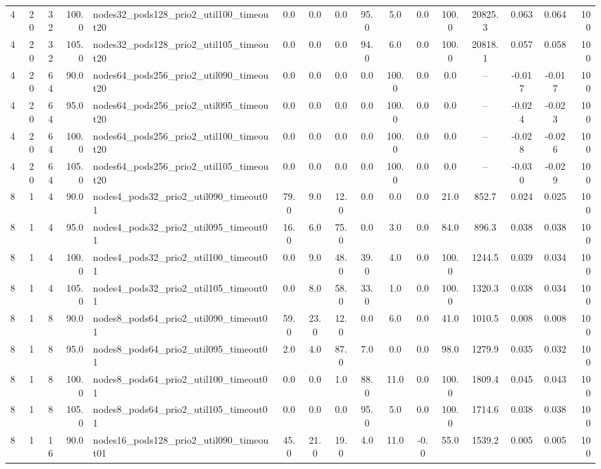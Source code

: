\begin{tabular}{r r r r l c c c c c c c c c c r}
4 & 20 & 32 & 100.0 & nodes32\_pods128\_prio2\_util100\_timeout20 & 0.0 & 0.0 & 0.0 & 95.0 & 5.0 & 0.0 & 100.0 & 20825.3 & 0.063 & 0.064 & 100 \\
4 & 20 & 32 & 105.0 & nodes32\_pods128\_prio2\_util105\_timeout20 & 0.0 & 0.0 & 0.0 & 94.0 & 6.0 & 0.0 & 100.0 & 20818.1 & 0.057 & 0.058 & 100 \\
4 & 20 & 64 & 90.0 & nodes64\_pods256\_prio2\_util090\_timeout20 & 0.0 & 0.0 & 0.0 & 0.0 & 100.0 & 0.0 & 0.0 & -- & -0.017 & -0.017 & 100 \\
4 & 20 & 64 & 95.0 & nodes64\_pods256\_prio2\_util095\_timeout20 & 0.0 & 0.0 & 0.0 & 0.0 & 100.0 & 0.0 & 0.0 & -- & -0.024 & -0.023 & 100 \\
4 & 20 & 64 & 100.0 & nodes64\_pods256\_prio2\_util100\_timeout20 & 0.0 & 0.0 & 0.0 & 0.0 & 100.0 & 0.0 & 0.0 & -- & -0.028 & -0.026 & 100 \\
4 & 20 & 64 & 105.0 & nodes64\_pods256\_prio2\_util105\_timeout20 & 0.0 & 0.0 & 0.0 & 0.0 & 100.0 & 0.0 & 0.0 & -- & -0.030 & -0.029 & 100 \\
8 & 1 & 4 & 90.0 & nodes4\_pods32\_prio2\_util090\_timeout01 & 79.0 & 9.0 & 12.0 & 0.0 & 0.0 & 0.0 & 21.0 & 852.7 & 0.024 & 0.025 & 100 \\
8 & 1 & 4 & 95.0 & nodes4\_pods32\_prio2\_util095\_timeout01 & 16.0 & 6.0 & 75.0 & 0.0 & 3.0 & 0.0 & 84.0 & 896.3 & 0.038 & 0.038 & 100 \\
8 & 1 & 4 & 100.0 & nodes4\_pods32\_prio2\_util100\_timeout01 & 0.0 & 9.0 & 48.0 & 39.0 & 4.0 & 0.0 & 100.0 & 1244.5 & 0.039 & 0.034 & 100 \\
8 & 1 & 4 & 105.0 & nodes4\_pods32\_prio2\_util105\_timeout01 & 0.0 & 8.0 & 58.0 & 33.0 & 1.0 & 0.0 & 100.0 & 1320.3 & 0.038 & 0.034 & 100 \\
8 & 1 & 8 & 90.0 & nodes8\_pods64\_prio2\_util090\_timeout01 & 59.0 & 23.0 & 12.0 & 0.0 & 6.0 & 0.0 & 41.0 & 1010.5 & 0.008 & 0.008 & 100 \\
8 & 1 & 8 & 95.0 & nodes8\_pods64\_prio2\_util095\_timeout01 & 2.0 & 4.0 & 87.0 & 7.0 & 0.0 & 0.0 & 98.0 & 1279.9 & 0.035 & 0.032 & 100 \\
8 & 1 & 8 & 100.0 & nodes8\_pods64\_prio2\_util100\_timeout01 & 0.0 & 0.0 & 1.0 & 88.0 & 11.0 & 0.0 & 100.0 & 1809.4 & 0.045 & 0.043 & 100 \\
8 & 1 & 8 & 105.0 & nodes8\_pods64\_prio2\_util105\_timeout01 & 0.0 & 0.0 & 0.0 & 95.0 & 5.0 & 0.0 & 100.0 & 1714.6 & 0.038 & 0.038 & 100 \\
8 & 1 & 16 & 90.0 & nodes16\_pods128\_prio2\_util090\_timeout01 & 45.0 & 21.0 & 19.0 & 4.0 & 11.0 & -0.0 & 55.0 & 1539.2 & 0.005 & 0.005 & 100 \\

\end{tabular}
